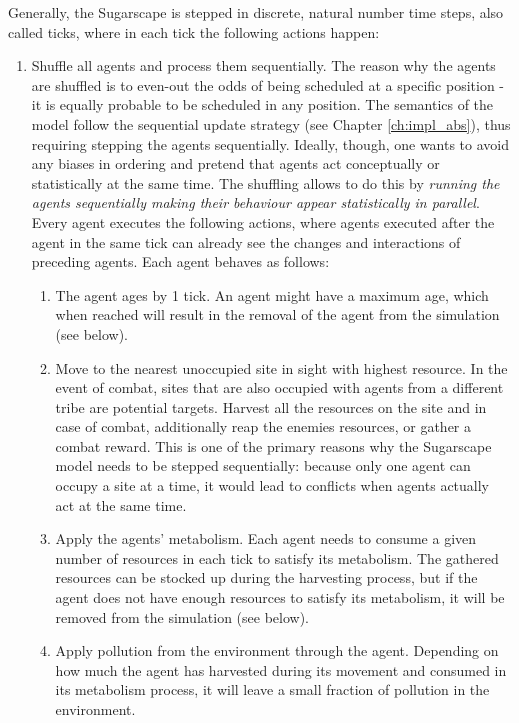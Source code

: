 Generally, the Sugarscape is stepped in discrete, natural number time steps, also called ticks, where in each tick the following actions happen:

\begin{enumerate}
	\item Shuffle all agents and process them sequentially. The reason why the agents are shuffled is to even-out the odds of being scheduled at a specific position - it is equally probable to be scheduled in any position. The semantics of the model follow the sequential update strategy (see Chapter \ref{ch:impl_abs}), thus requiring stepping the agents sequentially. Ideally, though, one wants to avoid any biases in ordering and pretend that agents act conceptually or statistically at the same time. The shuffling allows to do this by \textit{running the agents sequentially making their behaviour appear statistically in parallel}. Every agent executes the following actions, where agents executed after the agent in the same tick can already see the changes and interactions of preceding agents. Each agent behaves as follows:
	
	\begin{enumerate}
		\item The agent ages by 1 tick. An agent might have a maximum age, which when reached will result in the removal of the agent from the simulation (see below).
	
		\item Move to the nearest unoccupied site in sight with highest resource. In the event of combat, sites that are also occupied with agents from a different tribe are potential targets. Harvest all the resources on the site and in case of combat, additionally reap the enemies resources, or gather a combat reward. This is one of the primary reasons why the Sugarscape model needs to be stepped sequentially: because only one agent can occupy a site at a time, it would lead to conflicts when agents actually act at the same time.

		\item Apply the agents' metabolism. Each agent needs to consume a given number of resources in each tick to satisfy its metabolism. The gathered resources can be stocked up during the harvesting process, but if the agent does not have enough resources to satisfy its metabolism, it will be removed from the simulation (see below).
		
		\item Apply pollution from the environment through the agent. Depending on how much the agent has harvested during its movement and consumed in its metabolism process, it will leave a small fraction of pollution in the environment.
		

\end{enumerate}
\end{enumerate}
